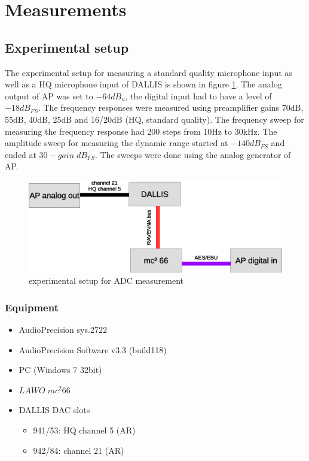 \documentclass[11pt]{report}
\begin{document}
\section{Measurements}
	\subsection{Experimental setup}
The experimental setup for measuring a standard quality microphone input as well as a HQ microphone input of DALLIS is shown in figure \ref{fig:adcstructure}. The analog output of AP was set to $-64dB_u$, the digital input had to have a level of $-18dB_{FS}$. The frequency responses were measured using preamplifier gains 70dB, 55dB, 40dB, 25dB and 16/20dB (HQ, standard quality). The frequency sweep for measuring the frequency response had 200 steps from 10Hz to 30kHz. The amplitude sweep for measuring the dynamic range started at $-140dB_{FS}$ and ended at $30-gain\; dB_{FS}$. The sweeps were done using the analog generator of AP.
\begin{figure}[htbp]
\begin{center}
\includegraphics[width=14cm,keepaspectratio=true]{ADCstructure}
\caption{experimental setup for ADC measurement}
\label{fig:adcstructure}
\end{center}
\end{figure}
		\subsubsection{Equipment}
\begin{itemize}
\item AudioPrecision sys.2722
\item AudioPrecision Software v3.3 (build118)
\item PC (Windows 7 32bit)
\item $LAWO \; mc^2 66$
\item DALLIS DAC slots
\begin{itemize}
\item 941/53: HQ channel 5 (AR)
\item 942/84: channel 21 (AR)
\end{itemize}
\end{itemize}
\end{document}
